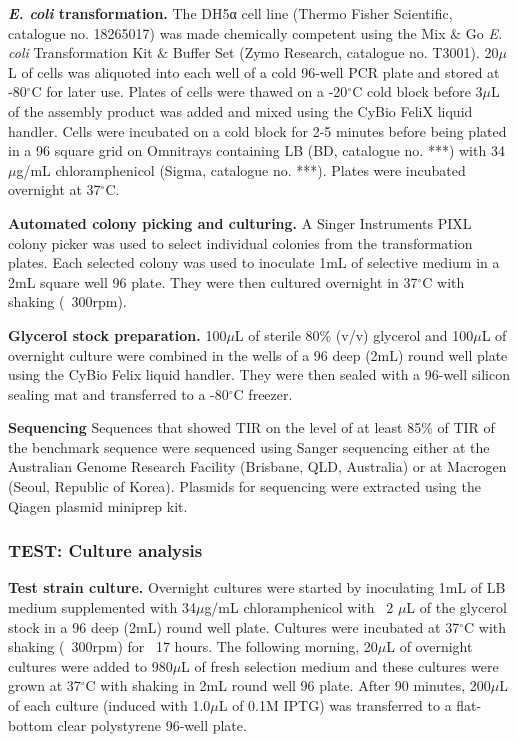 \textbf{\textit{E. coli} transformation.}
The DH5α cell line (Thermo Fisher Scientific, catalogue no. 18265017) was made chemically competent using the Mix $\&$ Go \textit{E. coli} Transformation Kit $\&$ Buffer Set (Zymo Research, catalogue no. T3001).
20$\mu$L of cells was aliquoted into each well of a cold 96-well PCR plate and stored at -80$^{\circ}$C for later use.
Plates of cells were thawed on a -20$^{\circ}$C cold block before 3$\mu$L of the assembly product was added and mixed using the CyBio FeliX liquid handler.
Cells were incubated on a cold block for 2-5 minutes before being plated in a 96 square grid on Omnitrays containing LB (BD, catalogue no. ***) with 34$\mu$g/mL chloramphenicol (Sigma, catalogue no. ***).
Plates were incubated overnight at 37$^{\circ}$C.

\textbf{Automated colony picking and culturing.}
A Singer Instruments PIXL colony picker was used to select individual colonies from the transformation plates.
Each selected colony was used to inoculate 1mL of selective medium in a 2mL square well 96 plate.
They were then cultured overnight in 37$^{\circ}$C with shaking (~300rpm).

\textbf{Glycerol stock preparation.}
100$\mu$L of sterile 80\% (v/v) glycerol and 100$\mu$L of overnight culture were combined in the wells of a 96 deep (2mL) round well plate using the CyBio Felix liquid handler.
They were then sealed with a 96-well silicon sealing mat and transferred to a -80$^{\circ}$C freezer. 

\textbf{Sequencing}
Sequences that showed TIR on the level of at least 85\% of TIR of the benchmark sequence were sequenced using Sanger sequencing either at the Australian Genome Research Facility (Brisbane, QLD, Australia) or at Macrogen (Seoul, Republic of Korea).
Plasmids for sequencing were extracted using the Qiagen plasmid miniprep kit.

\subsubsection{TEST: Culture analysis}

\textbf{Test strain culture.}
Overnight cultures were started by inoculating 1mL of LB medium supplemented with 34$\mu$g/mL chloramphenicol with ~2 $\mu$L of the glycerol stock in a 96 deep (2mL) round well plate.
Cultures were incubated at 37$^{\circ}$C with shaking (~300rpm) for ~17 hours. 
The following morning, 20$\mu$L of overnight cultures were added to 980$\mu$L of fresh selection medium and these cultures were grown at 37$^{\circ}$C with shaking in 2mL round well 96 plate. 
After 90 minutes, 200$\mu$L of each culture (induced with 1.0$\mu$L of 0.1M IPTG) was transferred to a flat-bottom clear polystyrene 96-well plate.

